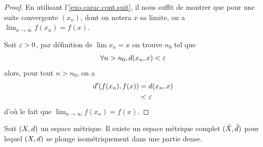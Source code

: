 \begin{proof}
  En utilisant l'\cref{exo.carac.cont.suit},
  il nous suffit de montrer que pour une suite convergente $(x_n)$, dont on
  notera $x$ sa limite, on a $\displaystyle\lim_{n \to \infty} f(x_n) = f(x)$.

  Soit $\varepsilon > 0$, par définition de $\lim x_n = x$ on trouve $n_0$ tel
  que
  \[\forall n > n_0, d(x_n,x) < \varepsilon\]
  alors, pour tout $n > n_0$, on a
  \begin{align*}
    d'(f(x_n),f(x)) &= d(x_n,x)\\
    &< \varepsilon
  \end{align*}
  d'où le fait que $\displaystyle\lim_{n\to\infty} f(x_n) = f(x)$.
\end{proof}

\begin{proposition}
  Soit $(X,d)$ un espace métrique. Il existe un espace métrique complet
  $(\hat{X},\hat{d})$ pour lequel $(X,d)$ se plonge isométriquement dans
  une partie dense.
\end{proposition}

